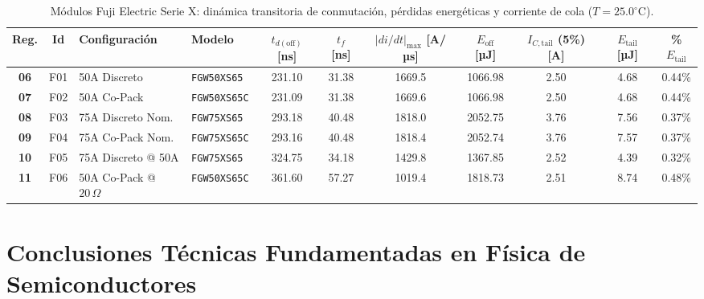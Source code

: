 \documentclass[11pt,a4paper]{article}
\begin{document}
\begin{landscape}
\begin{table}[htbp]
\centering
\small
\setlength{\tabcolsep}{5.2pt}
\caption{Módulos Fuji Electric Serie X: dinámica transitoria de conmutación, pérdidas energéticas y corriente de cola ($T = 25.0^\circ\text{C}$).}
\label{tab:fuji_dinamica}
\begin{tabular}{@{}c c l l c c c c c c c@{}}
\toprule
\textbf{Reg.} & \textbf{Id} & \textbf{Configuración} & \textbf{Modelo} & $t_{d(\text{off})}$ [ns] & $t_f$ [ns] & $|di/dt|_{\max}$ [A/µs] & $E_{\text{off}}$ [µJ] & $I_{C,\text{tail}}$ (5\%) [A] & $E_{\text{tail}}$ [µJ] & \textbf{\%}$E_{\text{tail}}$ \\
\midrule
\textbf{06} & F01 & 50A Discreto & \texttt{FGW50XS65}  & 231.10 & 31.38 & 1669.5 & 1066.98 & 2.50 & 4.68 & 0.44\% \\
\textbf{07} & F02 & 50A Co-Pack  & \texttt{FGW50XS65C} & 231.09 & 31.38 & 1669.6 & 1066.98 & 2.50 & 4.68 & 0.44\% \\
\textbf{08} & F03 & 75A Discreto Nom. & \texttt{FGW75XS65}  & 293.18 & 40.48 & 1818.0 & 2052.75 & 3.76 & 7.56 & 0.37\% \\
\textbf{09} & F04 & 75A Co-Pack Nom.  & \texttt{FGW75XS65C} & 293.16 & 40.48 & 1818.4 & 2052.74 & 3.76 & 7.57 & 0.37\% \\
\textbf{10} & F05 & 75A Discreto @ 50A & \texttt{FGW75XS65}  & 324.75 & 34.18 & 1429.8 & 1367.85 & 2.52 & 4.39 & 0.32\% \\
\textbf{11} & F06 & 50A Co-Pack @ $20\,\Omega$ & \texttt{FGW50XS65C} & 361.60 & 57.27 & 1019.4 & 1818.73 & 2.51 & 8.74 & 0.48\% \\
\bottomrule
\end{tabular}
\end{table}

\end{landscape}
\pagestyle{fancy}
\FloatBarrier

\section{Conclusiones Técnicas Fundamentadas en Física de Semiconductores}
\end{document}
